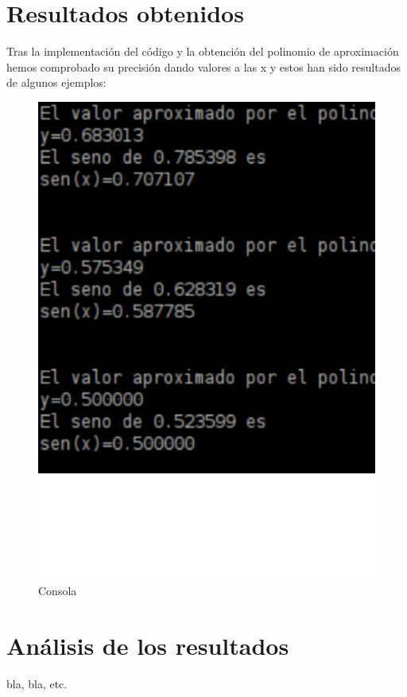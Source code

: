 \section{Resultados obtenidos}
\label{3:sec:3}
Tras la implementación del código y la obtención del polinomio de aproximación hemos comprobado su precisión dando valores a las x y estos han sido resultados de algunos ejemplos:
\vspace{1.5 true cm}


\begin{figure}
\includegraphics[scale=0.38]{images/comprobacion.eps}
\caption{Consola}
\label{graph:2}
\end{figure}
\section{Análisis de los resultados}
\label{3:sec:4}

bla, bla, etc. 


